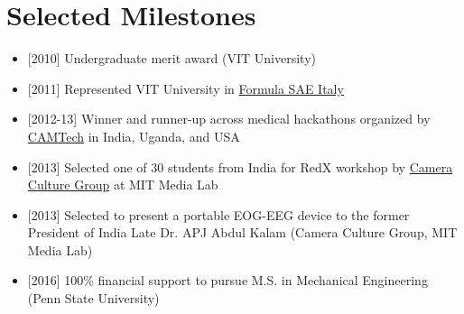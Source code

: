 \documentclass[letterpaper,10.5pt]{article}
\newcommand{\resumeSubHeadingListStart}{\begin{itemize}[leftmargin=*]}
\newcommand{\resumeSubHeadingListEnd}{\end{itemize}}
\begin{document}
\section{Selected Milestones}
 \resumeSubHeadingListStart
   \item{
    [2010] Undergraduate merit award (VIT University)
   }
   \item{
    [2011] Represented VIT University in \href{https://www.formula-ata.it/formula-sae-italy/}{\color{blue}Formula SAE Italy}
   }
   \item{
    [2012-13] Winner and runner-up across medical hackathons organized by \href{http://www.globalhealthmgh.org/camtech/}{\color{blue}CAMTech} in India, Uganda, and USA
   }
   \item{
    [2013] Selected one of 30 students from India for RedX workshop by \href{http://cameraculture.media.mit.edu/}{\color{blue}Camera Culture Group} at MIT Media Lab
   }
   \item{
    [2013] Selected to present a portable EOG-EEG device to the former President of India Late Dr. APJ Abdul Kalam (Camera Culture Group, MIT Media Lab) 
   }
   \item{
    [2016] 100\% financial support to pursue M.S. in Mechanical Engineering (Penn State University)
   }
 \resumeSubHeadingListEnd
 


\end{document}
